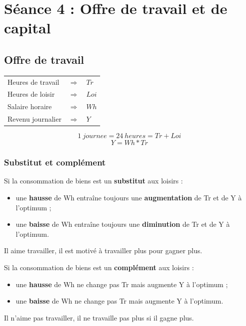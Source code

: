 \section{Séance 4 : Offre de travail et de capital}


\subsection{Offre de travail}



\begin{tabular}{lll}
	Heures de travail & $\Rightarrow$ & $Tr$\\
	Heures de loisir  & $\Rightarrow$ & $Loi$\\
	Salaire horaire   & $\Rightarrow$ & $Wh$\\
	Revenu journalier & $\Rightarrow$ & $Y$\\
\end{tabular}

$$1\ journee = 24\ heures = Tr + Loi$$
$$Y = Wh * Tr$$



\subsubsection{Substitut et complément}



Si la consommation de biens est un \textbf{substitut} aux loisirs :
\begin{itemize}
	\item une \textbf{hausse} de Wh entraîne toujours une \textbf{augmentation} de Tr et de Y à l'optimum ;
	\item une \textbf{baisse} de Wh entraîne toujours une \textbf{diminution} de Tr et de Y à l'optimum.
\end{itemize}
Il aime travailler, il est motivé à travailler plus pour gagner plus.


\vspace{0.5cm}


Si la consommation de biens est un \textbf{complément} aux loisirs :
\begin{itemize}
	\item une \textbf{hausse} de Wh ne change pas Tr mais augmente Y à l'optimum ;
	\item une \textbf{baisse} de Wh ne change pas Tr mais augmente Y à l'optimum.
\end{itemize}
Il n'aime pas travailler, il ne travaille pas plus si il gagne plus.\\


